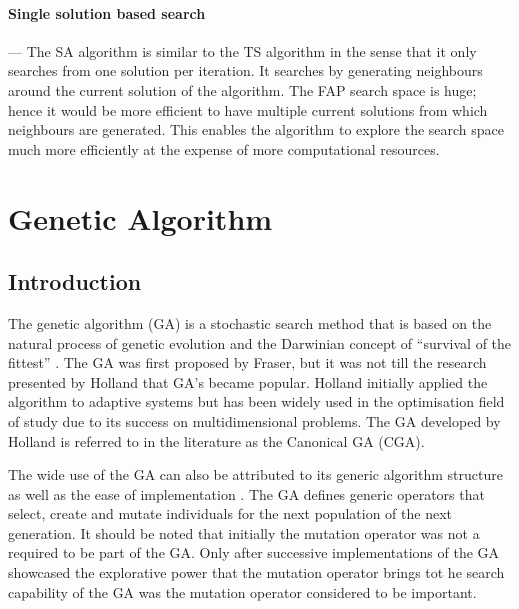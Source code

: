 \paragraph{Single solution based search}
--- The \gls{SA} algorithm is similar to the \gls{TS} algorithm in the sense that it only searches from one solution per iteration. It searches by generating neighbours around the current solution of the algorithm. The \gls{FAP} search space is huge; hence it would be more efficient to have multiple current solutions from which neighbours are generated. This enables the algorithm to explore the search space much more efficiently at the expense of more computational resources.

\section{Genetic Algorithm}
\label{sec:geneticalgorithm}
\subsection{Introduction}
The genetic algorithm (GA) is a stochastic search method that is based on the natural process of genetic evolution and the Darwinian concept of ``survival of the fittest'' \cite{DistributedHierarchicalGA,AcceleratingGA,AdaptiveSAGA,FamilyGA}. The \gls{GA} was first proposed by Fraser, but it was not till the research presented by Holland that \gls{GA}'s became popular\cite{CompuIntelligenceIntro}. Holland initially applied the algorithm to adaptive systems but has been widely used in the optimisation field of study due to its success on multidimensional problems\cite{ParallelGASA,DistributedHierarchicalGA,FamilyGA}. The \gls{GA} developed by Holland is referred to in the literature as the Canonical \gls{GA} (CGA)\cite{CompuIntelligenceIntro}.

The wide use of the \gls{GA} can also be attributed to its generic algorithm structure as well as the ease of implementation \cite{FamilyGA,AdaptiveSAGA}. The \gls{GA} defines generic operators that select, create and mutate individuals for the next population of the next generation\cite{CompuIntelligenceIntro}. It should be noted that initially the mutation operator was not a required to be part of the \gls{GA}. Only after successive implementations of the \gls{GA} showcased the explorative power that the mutation operator brings tot he search capability of the \gls{GA} was the mutation operator considered to be important\cite{CompuIntelligenceIntro}. 


